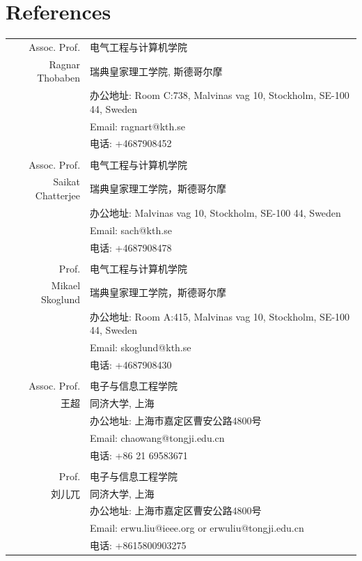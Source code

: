 \documentclass[a4paper,10pt]{article}
\begin{document}




\section{References}
\begin{longtable}[H]{r|p{13.5cm}}
  Assoc. Prof. & 电气工程与计算机学院\\
  Ragnar Thobaben &瑞典皇家理工学院, 斯德哥尔摩 \\
               & 办公地址: Room C:738, Malvinas vag 10, Stockholm, SE-100 44, Sweden \\
               & Email: ragnart@kth.se \\
               & 电话: +4687908452 \\

  \multicolumn{2}{c}{} \\
  Assoc. Prof. & 电气工程与计算机学院\\
  Saikat Chatterjee &瑞典皇家理工学院，斯德哥尔摩 \\
               & 办公地址: Malvinas vag 10, Stockholm, SE-100 44, Sweden \\
               & Email: sach@kth.se \\
               & 电话: +4687908478 \\

  \multicolumn{2}{c}{} \\

  Prof.  & 电气工程与计算机学院 \\
  Mikael Skoglund &瑞典皇家理工学院，斯德哥尔摩 \\
               & 办公地址: Room A:415, Malvinas vag 10, Stockholm, SE-100 44, Sweden \\
               & Email: skoglund@kth.se \\
               & 电话: +4687908430 \\

  \multicolumn{2}{c}{} \\
  Assoc. Prof. & 电子与信息工程学院 \\
  王超 & 同济大学, 上海 \\
               & 办公地址: 上海市嘉定区曹安公路4800号\\
               & Email: chaowang@tongji.edu.cn \\
               & 电话: +86 21 69583671\\

\multicolumn{2}{c}{} \\
  Prof. & 电子与信息工程学院 \\
  刘儿兀 & 同济大学, 上海 \\
               & 办公地址: 上海市嘉定区曹安公路4800号\\
               & Email: erwu.liu@ieee.org or erwuliu@tongji.edu.cn \\
               & 电话: +8615800903275

\end{longtable}
\end{document}
